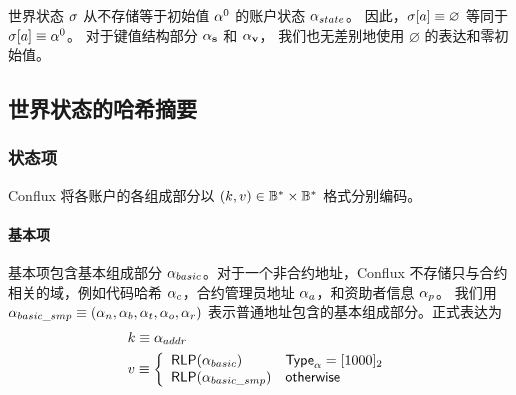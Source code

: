 世界状态 $\mathbf{\sigma}$ 从不存储等于初始值 $\mathbf{\alpha}^0$ 的账户状态 $\mathbf{\alpha}_{state}$。
因此，$\mathbf{\sigma}[a]\equiv \varnothing$ 等同于 $\mathbf{\sigma}[a]\equiv \mathbf{\alpha}^0$。
对于键值结构部分 $\mathbf{\alpha}_{\bf s}$ 和 $\mathbf{\alpha}_{\bf v}$， 我们也无差别地使用 $\varnothing$ 的表达和零初始值。

\subsection{世界状态的哈希摘要}

\subsubsection{状态项}

Conflux 将各账户的各组成部分以 $(k,v)\in \mathbb{B}^*\times \mathbb{B}^*$ 格式分别编码。

\paragraph{基本项} 基本项包含基本组成部分 $\mathbf{\alpha}_{basic}$。对于一个非合约地址，Conflux 不存储只与合约相关的域，例如代码哈希 $\mathbf{\alpha}_c$，合约管理员地址 $\mathbf{\alpha}_a$，和资助者信息 $\mathbf{\alpha}_p$。
我们用 $\mathbf{\alpha}_{basic\_smp}\equiv (\mathbf{\alpha}_n, \mathbf{\alpha}_b, \mathbf{\alpha}_t, \mathbf{\alpha}_o, \mathbf{\alpha}_r)$ 表示普通地址包含的基本组成部分。正式表达为
\begin{align}
	&k\equiv \alpha_{addr}\\
	&v\equiv \left\{\begin{array}{ll}
		\mathsf{RLP}(\mathbf{\alpha}_{basic}) & \mathsf{Type}_\alpha=[1000]_2 \\
		\mathsf{RLP}(\mathbf{\alpha}_{basic\_smp}) & \mathsf{otherwise}
	\end{array}\right.
\end{align}
	
